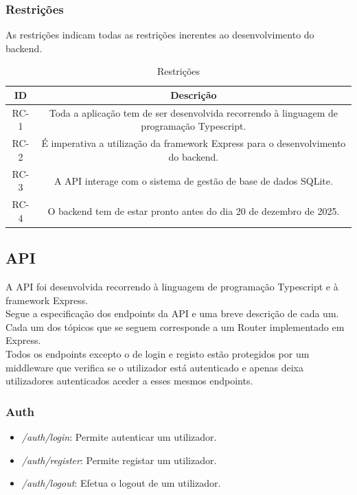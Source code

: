 \documentclass{article}
\begin{document}
		\subsubsection{Restrições}
		As restrições indicam todas as restrições inerentes ao desenvolvimento do backend.
		\begin{table}[H]
			\centering
			\begin{tabular}{|c|c|}
				\hline
				ID & Descrição \\
				\hline
				RC-1 & Toda a aplicação tem de ser desenvolvida recorrendo à linguagem de programação Typescript. \\
				\hline
				RC-2 & É imperativa a utilização da framework Express para o desenvolvimento do backend. \\
				\hline
				RC-3 & A API interage com o sistema de gestão de base de dados SQLite. \\
				\hline
				RC-4 & O backend tem de estar pronto antes do dia 20 de dezembro de 2025. \\
				\hline
			\end{tabular}
			\caption{Restrições}
		\end{table}
	\subsection{API}
	A API foi desenvolvida recorrendo à linguagem de programação Typescript e à framework Express. \\
	Segue a especificação dos endpoints da API e uma breve descrição de cada um. \\
	Cada um dos tópicos que se seguem corresponde a um Router implementado em Express. \\
	Todos os endpoints excepto o de login e registo estão protegidos por um middleware que verifica se o utilizador está autenticado e apenas deixa utilizadores autenticados aceder a esses mesmos endpoints. \\
	\subsubsection{Auth}
	
	\begin{itemize}
		\item \textit{/auth/login}: Permite autenticar um utilizador.
		\item \textit{/auth/register}: Permite registar um utilizador.
		\item \textit{/auth/logout}: Efetua o logout de um utilizador.
	\end{itemize}
	
\end{document}
